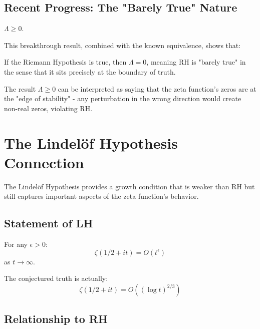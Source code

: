 \subsection{Recent Progress: The "Barely True" Nature}

\begin{theorem}
$\Lambda \geq 0$.
\end{theorem}

This breakthrough result, combined with the known equivalence, shows that:

\begin{corollary}
If the Riemann Hypothesis is true, then $\Lambda = 0$, meaning RH is "barely true" in the sense that it sits precisely at the boundary of truth.
\end{corollary}

\begin{remark}
The result $\Lambda \geq 0$ can be interpreted as saying that the zeta function's zeros are at the "edge of stability" - any perturbation in the wrong direction would create non-real zeros, violating RH.
\end{remark}

\section{The Lindelöf Hypothesis Connection}

The Lindelöf Hypothesis provides a growth condition that is weaker than RH but still captures important aspects of the zeta function's behavior.

\subsection{Statement of LH}

\begin{hypothesis}
For any $\epsilon > 0$:
\begin{equation}
\zeta(1/2 + it) = O(t^{\epsilon})
\end{equation}
as $t \to \infty$.
\end{hypothesis}

The conjectured truth is actually:
\begin{equation}
\zeta(1/2 + it) = O((\log t)^{2/3})
\end{equation}

\subsection{Relationship to RH}

